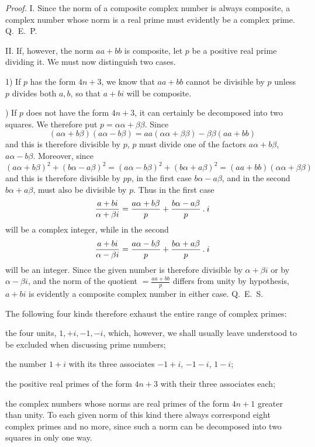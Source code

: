 \emph{Proof.} I. Since the norm of a composite complex number is always composite, a complex number whose norm is a real prime must evidently be a complex prime. \mbox{Q. E. P.}

II. If, however, the norm $aa+bb$ is composite, let $p$ be a positive real prime dividing it. We must now distinguish two cases.

1) If $p$ has the form $4n+3$, we know that $aa+bb$ cannot be divisible by $p$ unless $p$ divides both $a,b$, so that $a+bi$ will be composite.

\begingroup{}) If $p$ does not have the form $4n+3$, it can certainly be decomposed into two squares. We therefore put $p=\alpha\alpha+\beta\beta$. Since
\[
(a\alpha+b\beta)(a\alpha-b\beta)=aa(\alpha\alpha+\beta\beta)-\beta\beta(aa+bb)
\]
and this is therefore divisible by $p$, $p$ must divide one of the factors $a\alpha+b\beta$, $a\alpha-b\beta$. Moreover, since
\[
(a\alpha+b\beta)^2+(b\alpha-a\beta)^2=(a\alpha-b\beta)^2+(b\alpha+a\beta)^2=(aa+bb)(\alpha\alpha+\beta\beta)
\]
and this is therefore divisible by $pp$, in the first case $b\alpha-a\beta$, and in the second $b\alpha+a\beta$, must also be divisible by $p$. Thus in the first case
\[
\frac{a+bi}{\alpha+\beta i}=\frac{a\alpha+b\beta}{p}+\frac{b\alpha-a\beta}{p}\mathbin{.} i
\]
will be a complex integer, while in the second
\[
\frac{a+bi}{\alpha-\beta i}=\frac{a\alpha-b\beta}{p}+\frac{b\alpha+a\beta}{p}\mathbin{.} i
\]
will be an integer. Since the given number is therefore divisible by $\alpha+\beta i$ or by $\alpha-\beta i$, and the norm of the quotient $=\frac{aa+bb}{p}$ differs from unity by hypothesis, $a+bi$ is evidently a composite complex number in either case. \mbox{Q. E. S.}\endgroup

%
The following four kinds therefore exhaust the entire range of complex primes:

\begin{list}{}{\setlength{\leftmargin}{1.7em}\setlength{\labelwidth}{1.5em}\setlength{\labelsep}{.2em}}
\item[1)] the four units, $1,+i,-1,-i$, which, however, we shall usually leave understood to be excluded when discussing prime numbers;
\item[2)] the number $1+i$ with its three associates $-1+i$, $-1-i$, $1-i$;
\item[3)] the positive real primes of the form $4n+3$ with their three associates each;
\item[4)] the complex numbers whose norms are real primes of the form $4n+1$ greater than unity. To each given norm of this kind there always correspond eight complex primes and no more, since such a norm can be decomposed into two squares in only one way.
\end{list}

